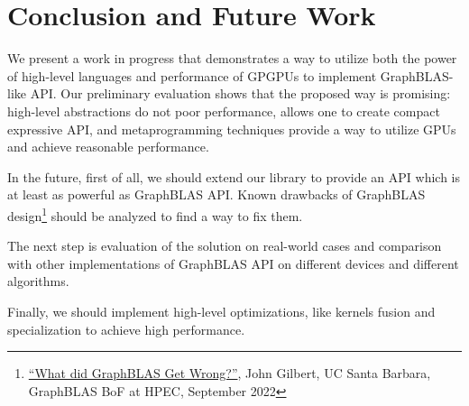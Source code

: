 \section{Conclusion and Future Work}


We present a work in progress that demonstrates a way to utilize both the power of high-level languages and performance of GPGPUs to implement GraphBLAS-like API.
Our preliminary evaluation shows that the proposed way is promising: high-level abstractions do not poor performance, allows one to create compact expressive API, and metaprogramming techniques provide a way to utilize GPUs and achieve reasonable performance.

In the future, first of all, we should extend our library to provide an API which is at least as powerful as GraphBLAS API. Known drawbacks of GraphBLAS design\footnote{\href{https://docs.google.com/document/d/1fMmm-Bmew0wpgJRrjyMHy6G-zPq6R6kQlRum560_4S0/edit}{``What did GraphBLAS Get Wrong?''}, John Gilbert, UC Santa Barbara, GraphBLAS BoF at HPEC, September 2022} should be analyzed to find a way to fix them. 

The next step is evaluation of the solution on real-world cases and comparison with other implementations of GraphBLAS API on different devices and different algorithms.


Finally, we should implement high-level optimizations, like kernels fusion and specialization to achieve high performance.


